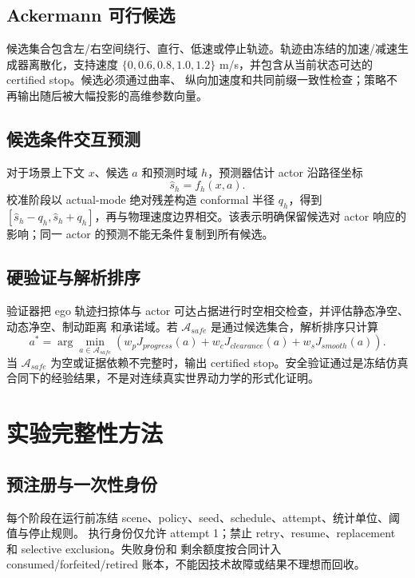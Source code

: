 \documentclass[12pt,a4paper,oneside]{report}
\begin{document}
\section{Ackermann 可行候选}
候选集合包含左/右空间绕行、直行、低速或停止轨迹。轨迹由冻结的加速/减速生成器离散化，支持速度
$\{0,0.6,0.8,1.0,1.2\}$ m/s，并包含从当前状态可达的 certified stop。候选必须通过曲率、
纵向加速度和共同前缀一致性检查；策略不再输出随后被大幅投影的高维参数向量。

\section{候选条件交互预测}
对于场景上下文 $x$、候选 $a$ 和预测时域 $h$，预测器估计 actor 沿路径坐标
\begin{equation}
  \hat{s}_{h}=f_h(x,a).
\end{equation}
校准阶段以 actual-mode 绝对残差构造 conformal 半径 $q_h$，得到
$[\hat{s}_{h}-q_h,\hat{s}_{h}+q_h]$，再与物理速度边界相交。该表示明确保留候选对 actor 响应的
影响；同一 actor 的预测不能无条件复制到所有候选。

\section{硬验证与解析排序}
验证器把 ego 轨迹扫掠体与 actor 可达占据进行时空相交检查，并评估静态净空、动态净空、制动距离
和承诺域。若 $\mathcal{A}_{safe}$ 是通过候选集合，解析排序只计算
\begin{equation}
 a^*=\arg\min_{a\in\mathcal{A}_{safe}}
 \left(w_pJ_{progress}(a)+w_cJ_{clearance}(a)+w_sJ_{smooth}(a)\right).
\end{equation}
当 $\mathcal{A}_{safe}$ 为空或证据依赖不完整时，输出 certified stop。安全验证通过是冻结仿真
合同下的经验结果，不是对连续真实世界动力学的形式化证明。

\chapter{实验完整性方法}
\section{预注册与一次性身份}
每个阶段在运行前冻结 scene、policy、seed、schedule、attempt、统计单位、阈值与停止规则。
执行身份仅允许 attempt 1；禁止 retry、resume、replacement 和 selective exclusion。失败身份和
剩余额度按合同计入 consumed/forfeited/retired 账本，不能因技术故障或结果不理想而回收。
\end{document}
